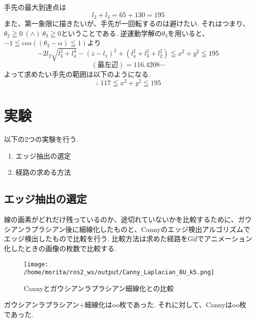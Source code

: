 \documentclass[10pt]{jarticle}
\begin{document}
	手先の最大到達点は
	\begin{equation*}
		l_2+l_3  =  65+130  =  195
	\end{equation*}
	また、第一象限に描きたいが、手先が一回転するのは避けたい.
	それはつまり、$  \theta_2  \geqq  0\  (\land)  \  \theta_3  \geqq0$ということである.
	逆運動学解の$\theta_3$を用いると、$  -1  \leqq  cos((\theta_3  -  \alpha)  \leqq  1)$より
	\begin{equation*}
		-2l_2\sqrt{l_3^2+l_4^4}  - (z-l_1)^2  +  (l_4^2  +  l_3^2  +  l_2^2)  \leqq  x^2  +  y^2  \leqq  195
	\end{equation*}
	$$
		(\text{最左辺})  =  116.4208  \cdots
	$$
	よって求めたい手先の範囲は以下のようになる.
	\begin{equation*}
		\therefore\  117  \leqq  x^2  +  y^2  \leqq  195
	\end{equation*}


	\section{実験}

	以下の2つの実験を行う.
	
	\begin{enumerate}
		\item エッジ抽出の選定
		\item 経路の求める方法
	\end{enumerate}

	
	\subsection{エッジ抽出の選定}
	
	線の画素がどれだけ残っているのか、途切れていないかを比較するために、ガウシアンラプラシアン後に細線化したものと、Cannyのエッジ検出アルゴリズムでエッジ検出したもので比較を行う.
	比較方法は求めた経路をGifでアニメーション化したときの画像の枚数で比較する.


    \begin{center}
        \begin{figure}[h]
            \texttt{[image: /home/morita/ros2\_ws/output/Canny\_Laplacian\_8U\_k5.png]}
            \caption{Cannyとガウシアンラプラシアン細線化との比較}
            \label{CannyVSGaussianLaplacian}
        \end{figure}
    \end{center}
	

	ガウシアンラプラシアン+細線化はoo枚であった.
	それに対して、Cannyはoo枚であった.
\end{document}
